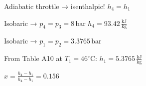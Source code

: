 Adiabatic throttle → isenthalpic!  
\( h_4 = h_1 \)  

Isobaric → \( p_4 = p_3 = 8 \, \text{bar} \)  
\( h_4 = 93.42 \, \frac{\text{kJ}}{\text{kg}} \)  

Isobaric → \( p_1 = p_2 = 3.3765 \, \text{bar} \)  

From Table A10 at \( T_1 = 46^\circ \text{C} \):  
\( h_1 = 5.3765 \, \frac{\text{kJ}}{\text{kg}} \)  

\( x = \frac{h_4 - h_1}{h_4 - h_1} = 0.156 \)